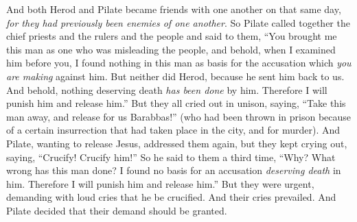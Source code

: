 \begin{biblechapter}
\verse And both Herod and Pilate became friends with one another on that same day, \textit{for they had previously been enemies of one another}.
 So Pilate called together the chief priests and the rulers and the people
\verse and said to them, “You brought me this man as one who was misleading the people, and behold, when I examined him before you, I found nothing in this man as basis for the accusation which \textit{you are making} against him.
\verse But neither did Herod, because he sent him back to us. And behold, nothing deserving death \textit{has been done} by him.
\verse Therefore I will punish him and release him.” 
\verse But they all cried out in unison, saying, “Take this man away, and release for us Barabbas!”
\verse (who had been thrown in prison because of a certain insurrection that had taken place in the city, and for murder).
\verse And Pilate, wanting to release Jesus, addressed them﻿ again,
\verse but they kept crying out, saying, “Crucify! Crucify him!”
\verse So he said to them a third time, “Why? What wrong has this man done? I found no basis for an accusation \textit{deserving death} in him. Therefore I will punish him and release him.”
\verse But they were urgent, demanding with loud cries that he be crucified. And their cries prevailed.
\verse And Pilate decided that their demand should be granted.

\end{biblechapter}
